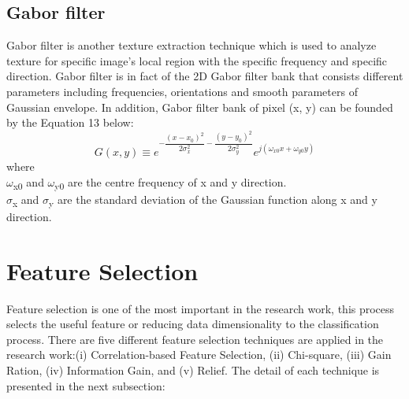 \documentclass[review]{elsarticle}
\begin{document}
\subsection{Gabor filter }
Gabor filter is another texture extraction technique which is used to analyze texture for specific image’s local region with the specific frequency and specific direction. Gabor filter is in fact of the 2D Gabor filter bank that consists different parameters including frequencies, orientations and smooth parameters of Gaussian envelope. In addition, Gabor filter bank of pixel (x, y) can be founded by the Equation 13 below: 
\begin{equation}
G(x,y)\equiv e^{-{\dfrac{(x-x_0)^2}{2\sigma^2_x}-\dfrac{(y-y_0)^2}{2\sigma^2_y}}} e^{j(\omega_{x0}x+\omega_{y0}y)}
\end{equation}
where \\
$\omega$\textsubscript{x0}   and   $\omega$\textsubscript{y0} \hspace{0.2cm}   are the centre frequency of x and y direction.\\
$\sigma$\textsubscript{x}    and   $\sigma$\textsubscript{y}   \hspace{0.5cm}  are the standard deviation of the Gaussian function along x and y direction. 


\section{Feature Selection}
Feature selection is one of the most important in the research work, this process selects the useful feature or reducing data dimensionality to the classification process. There are five different feature selection techniques are applied in the research work:(i) Correlation-based Feature Selection, (ii) Chi-square, (iii) Gain Ration, (iv) Information Gain, and (v) Relief. The detail of each technique is presented in the next subsection: 
\end{document}
